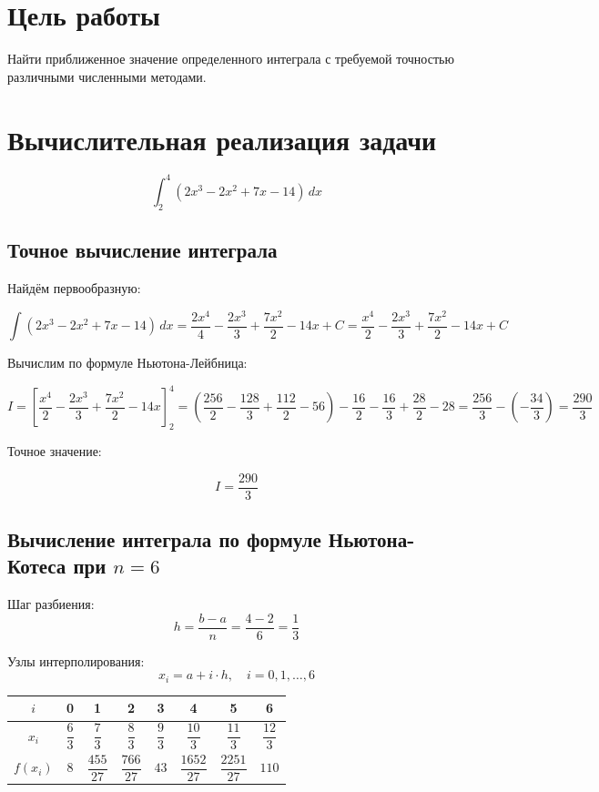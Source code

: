 \section{Цель работы}

Найти приближенное значение определенного интеграла с требуемой точностью различными численными методами.

\section{Вычислительная реализация задачи}

\[
\int_{2}^{4} (2x^3 - 2x^2 + 7x - 14)\,dx
\]

\subsection{Точное вычисление интеграла}

Найдём первообразную:

\[
\int (2x^3 - 2x^2 + 7x - 14)\,dx = \frac{2x^4}{4} - \frac{2x^3}{3} + \frac{7x^2}{2} - 14x + C = \frac{x^4}{2} - \frac{2x^3}{3} + \frac{7x^2}{2} - 14x + C 
\]

Вычислим по формуле Ньютона-Лейбница:

\[
I = \left[\frac{x^4}{2} - \frac{2x^3}{3} + \frac{7x^2}{2} - 14x\right]_{2}^{4}
= (\frac{256}{2} - \frac{128}{3} + \frac{112}{2} - 56) - \frac{16}{2} - \frac{16}{3} + \frac{28}{2} - 28
= \frac{256}{3} - \left(-\frac{34}{3}\right)
= \frac{290}{3} 
\]

Точное значение:

\[
\boxed{
I = \frac{290}{3}
}
\]

\subsection{Вычисление интеграла по формуле Ньютона-Котеса при $n = 6$}

Шаг разбиения:
\[
h = \frac{b-a}{n} = \frac{4-2}{6} = \frac{1}{3}
\]

Узлы интерполирования:
\[
x_i = a + i\cdot h,\quad i = 0,1,\ldots,6
\]

\begin{table}[h!]
\centering
\label{tab:newton-cotes}
\renewcommand{\arraystretch}{2.25}
\begin{tabular}{|c|c|c|c|c|c|c|c|}
\hline
$i$ & 0 & 1 & 2 & 3 & 4 & 5 & 6 \\
\hline
$x_i$ & $\dfrac{6}{3}$ & $\dfrac{7}{3}$ & $\dfrac{8}{3}$ & $\dfrac{9}{3}$ & $\dfrac{10}{3}$ & $\dfrac{11}{3}$ & $\dfrac{12}{3}$ \\
\hline
$f(x_i)$ & $8$ & $\dfrac{455}{27}$ & $\dfrac{766}{27}$ & $43$ & $\dfrac{1652}{27}$ & $\dfrac{2251}{27}$ & $110$ \\
\hline
\end{tabular}
\end{table}

